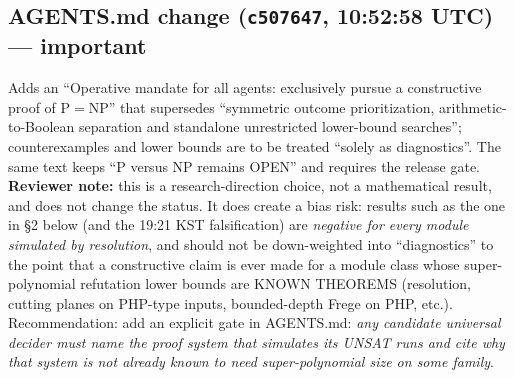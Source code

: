 \documentclass[11pt]{article}
\begin{document}
\subsection*{AGENTS.md change (\texttt{c507647}, 10:52:58 UTC) --- important}
Adds an ``Operative mandate for all agents: exclusively pursue a constructive proof of P$=$NP'' that supersedes ``symmetric outcome prioritization, arithmetic-to-Boolean separation and standalone unrestricted lower-bound searches''; counterexamples and lower bounds are to be treated ``solely as diagnostics''. The same text keeps ``P versus NP remains OPEN'' and requires the release gate. \textbf{Reviewer note:} this is a research-direction choice, not a mathematical result, and does not change the status. It does create a bias risk: results such as the one in \S2 below (and the 19:21 KST falsification) are \emph{negative for every module simulated by resolution}, and should not be down-weighted into ``diagnostics'' to the point that a constructive claim is ever made for a module class whose super-polynomial refutation lower bounds are KNOWN THEOREMS (resolution, cutting planes on PHP-type inputs, bounded-depth Frege on PHP, etc.). Recommendation: add an explicit gate in AGENTS.md: \emph{any candidate universal decider must name the proof system that simulates its UNSAT runs and cite why that system is not already known to need super-polynomial size on some family}.
\end{document}
